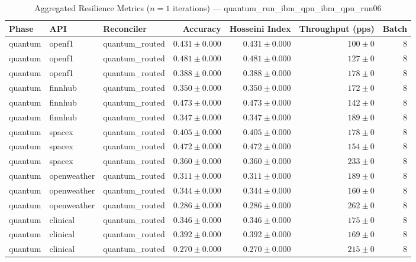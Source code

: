 
\begin{table}[htbp]
\caption{Aggregated Resilience Metrics ($n=1$ iterations) --- quantum_run_ibm_qpu_ibm_qpu_run06}
\begin{tabular}{l l l r r r r}
\hline
Phase & API & Reconciler & Accuracy & Hosseini Index & Throughput (pps) & Batch \\
\hline
quantum & openf1 & quantum\_routed & $0.431\pm0.000$ & $0.431\pm0.000$ & $100\pm0$ & 8 \\
quantum & openf1 & quantum\_routed & $0.481\pm0.000$ & $0.481\pm0.000$ & $127\pm0$ & 8 \\
quantum & openf1 & quantum\_routed & $0.388\pm0.000$ & $0.388\pm0.000$ & $178\pm0$ & 8 \\
quantum & finnhub & quantum\_routed & $0.350\pm0.000$ & $0.350\pm0.000$ & $172\pm0$ & 8 \\
quantum & finnhub & quantum\_routed & $0.473\pm0.000$ & $0.473\pm0.000$ & $142\pm0$ & 8 \\
quantum & finnhub & quantum\_routed & $0.347\pm0.000$ & $0.347\pm0.000$ & $189\pm0$ & 8 \\
quantum & spacex & quantum\_routed & $0.405\pm0.000$ & $0.405\pm0.000$ & $178\pm0$ & 8 \\
quantum & spacex & quantum\_routed & $0.472\pm0.000$ & $0.472\pm0.000$ & $154\pm0$ & 8 \\
quantum & spacex & quantum\_routed & $0.360\pm0.000$ & $0.360\pm0.000$ & $233\pm0$ & 8 \\
quantum & openweather & quantum\_routed & $0.311\pm0.000$ & $0.311\pm0.000$ & $189\pm0$ & 8 \\
quantum & openweather & quantum\_routed & $0.344\pm0.000$ & $0.344\pm0.000$ & $160\pm0$ & 8 \\
quantum & openweather & quantum\_routed & $0.286\pm0.000$ & $0.286\pm0.000$ & $262\pm0$ & 8 \\
quantum & clinical & quantum\_routed & $0.346\pm0.000$ & $0.346\pm0.000$ & $175\pm0$ & 8 \\
quantum & clinical & quantum\_routed & $0.392\pm0.000$ & $0.392\pm0.000$ & $169\pm0$ & 8 \\
quantum & clinical & quantum\_routed & $0.270\pm0.000$ & $0.270\pm0.000$ & $215\pm0$ & 8 \\

\end{tabular}
\end{table}
